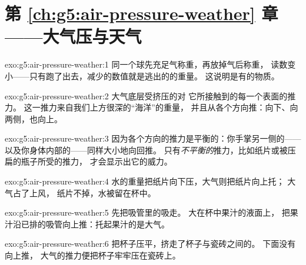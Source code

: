 \section*{第 \ref{ch:g5:air-pressure-weather} 章——大气压与天气}

\begin{solution}{exo:g5:air-pressure-weather:1}
同一个球先充足气称重，再放掉气后称重，
读数变小——只有跑了出去，减少的数值就是逃出的的重量。
这说明是有的物质。
\end{solution}

\begin{solution}{exo:g5:air-pressure-weather:2}
大气底层受挤压的对
它所接触到的每一个表面的推力。
这一推力来自我们上方很深的“海洋”的重量，
并且从各个方向推：向下、向两侧，也向上。
\end{solution}

\begin{solution}{exo:g5:air-pressure-weather:3}
因为各个方向的推力是平衡的：你手掌另一侧的——
以及你身体内部的——同样大小地向回推。
只有\emph{不平衡的}推力，比如纸片或被压扁的瓶子所受的推力，
才会显示出它的威力。
\end{solution}

\begin{solution}{exo:g5:air-pressure-weather:4}
水的重量把纸片向下压，大气则把纸片向上托；
大气占了上风，
纸片不掉，水被留在杯中。
\end{solution}

\begin{solution}{exo:g5:air-pressure-weather:5}
先把吸管里的\emph{}吸走。
大在杯中果汁的液面上，
把果汁沿已排的吸管向上推：托起果汁的是大气。
\end{solution}

\begin{solution}{exo:g5:air-pressure-weather:6}
把杯子压平，挤走了杯子与瓷砖之间的。
下面没有向上推，
大气的推力便把杯子牢牢压在瓷砖上。
\end{solution}

